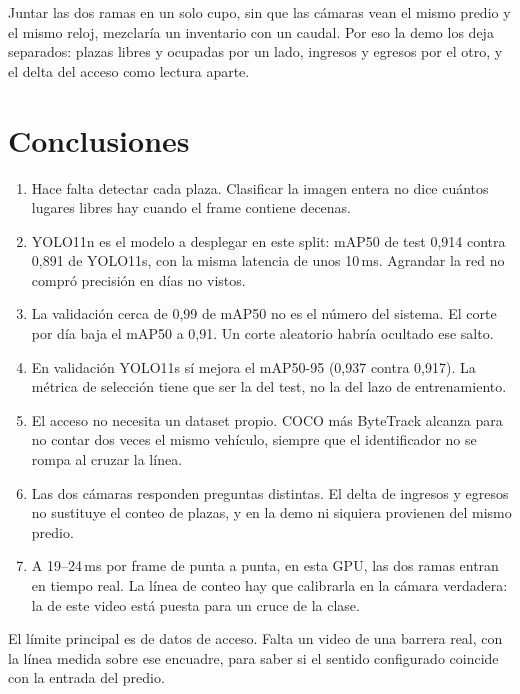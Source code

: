\documentclass[conference,a4paper]{IEEEtran}
\begin{document}
Juntar las dos ramas en un solo cupo, sin que las cámaras vean el mismo predio y el mismo reloj, mezclaría un inventario con un caudal. Por eso la demo los deja separados: plazas libres y ocupadas por un lado, ingresos y egresos por el otro, y el delta del acceso como lectura aparte.

\section{Conclusiones}
\begin{enumerate}
\item Hace falta detectar cada plaza. Clasificar la imagen entera no dice cuántos lugares libres hay cuando el frame contiene decenas.
\item YOLO11n es el modelo a desplegar en este split: mAP50 de test 0,914 contra 0,891 de YOLO11s, con la misma latencia de unos 10\,ms. Agrandar la red no compró precisión en días no vistos.
\item La validación cerca de 0,99 de mAP50 no es el número del sistema. El corte por día baja el mAP50 a 0,91. Un corte aleatorio habría ocultado ese salto.
\item En validación YOLO11s sí mejora el mAP50-95 (0,937 contra 0,917). La métrica de selección tiene que ser la del test, no la del lazo de entrenamiento.
\item El acceso no necesita un dataset propio. COCO más ByteTrack alcanza para no contar dos veces el mismo vehículo, siempre que el identificador no se rompa al cruzar la línea.
\item Las dos cámaras responden preguntas distintas. El delta de ingresos y egresos no sustituye el conteo de plazas, y en la demo ni siquiera provienen del mismo predio.
\item A 19--24\,ms por frame de punta a punta, en esta GPU, las dos ramas entran en tiempo real. La línea de conteo hay que calibrarla en la cámara verdadera: la de este video está puesta para un cruce de la clase.
\end{enumerate}

El límite principal es de datos de acceso. Falta un video de una barrera real, con la línea medida sobre ese encuadre, para saber si el sentido configurado coincide con la entrada del predio.



\end{document}
